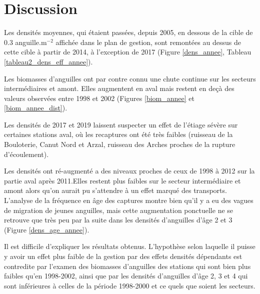 \documentclass[10pt,twocolumn,titlepage,twoside]{article}\usepackage[]{graphicx}\usepackage[]{color}
\begin{document}
\section*{}


\section[Discussion]{ Discussion}

Les densités moyennes, qui étaient passées, depuis 2005, en dessous de la cible
de 0.3 anguille.m$^{-2}$ affichée dans le plan de gestion, sont remontées au
dessus de cette cible à partir de 2014, à l'exception de 2017 (Figure
\ref{dens_annee}, Tableau \ref{tableau2_dens_eff_annee}). 

Les biomasses d'anguilles ont par contre connu une chute
continue sur les secteurs intermédiaires et amont. Elles augmentent en aval mais
restent en deçà des valeurs observées entre 1998 et 2002 (Figures
\ref{biom_annee} et \ref{biom_annee_dist}).

Les densités de 2017 et 2019 laissent suspecter un effet de l'étiage sévère sur
certaines stations aval, où les recaptures ont été très faibles 
(ruisseau de la Bouloterie, Canut Nord et Arzal, ruisseau des
Arches proches de la rupture d'écoulement).

Les densités ont
ré-augmenté a des niveaux proches de ceux de 1998 à 2012 sur la partie aval
après 2011.Elles restent plus faibles sur le secteur intermédiaire et amont
alors qu'on aurait pu s'attendre à un effet marqué des transports.
L'analyse de la fréquence en âge des captures montre bien qu'il y a eu des vagues de migration 
de jeunes anguilles, mais cette augmentation ponctuelle ne se retrouve que très
peu par la suite dans les densités d'anguilles d'âge 2 et 3 (Figure
\ref{dens_age_annee}).

Il est difficile d'expliquer les résultats obtenus. 
L'hypothèse selon laquelle il puisse y avoir un effet plus faible de la gestion 
par des effets densités dépendants est contredite par l'examen des biomasses d'anguilles
des stations qui sont bien plus faibles qu'en 1998-2002, ainsi que par les densités 
d'anguilles d'âge 2, 3 et 4 qui sont inférieures à celles de la période 1998-2000 et 
ce quels que soient les secteurs. 
\end{document}
